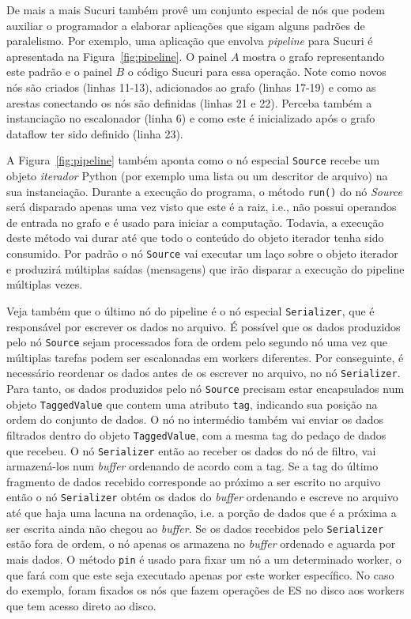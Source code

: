De mais a mais Sucuri também provê um conjunto especial de nós que podem auxiliar o programador a elaborar aplicações que sigam alguns padrões de paralelismo.
Por exemplo, uma aplicação que envolva \emph{pipeline} para Sucuri é apresentada na Figura~\ref{fig:pipeline}.
O painel $A$ mostra o grafo representando este padrão e o painel $B$ o código Sucuri para essa operação.
Note como novos nós são criados (linhas 11-13), adicionados ao grafo (linhas 17-19) e como as arestas conectando os nós são definidas (linhas 21 e 22).
Perceba também a instanciação no escalonador (linha 6) e como este é inicializado após o grafo dataflow ter sido definido (linha 23).

A Figura~\ref{fig:pipeline} também aponta como o nó especial \texttt{Source} recebe um objeto \emph{iterador} Python (por exemplo uma lista ou um descritor de arquivo) na sua instanciação.
Durante a execução do programa, o método \texttt{run()} do nó \emph{Source} será disparado apenas uma vez visto que este é a raiz, i.e., não possui operandos de entrada no grafo e é usado para iniciar a computação.
Todavia, a execução deste método vai durar até que todo o conteúdo do objeto iterador tenha sido consumido.
Por padrão o nó \texttt{Source} vai executar um laço sobre o objeto iterador e produzirá múltiplas saídas (mensagens) que irão disparar a execução do pipeline múltiplas vezes.

Veja também que o último nó do pipeline é o nó especial \texttt{Serializer}, que é responsável por escrever os dados no arquivo.
É possível que os dados produzidos pelo nó \texttt{Source} sejam processados fora de ordem pelo segundo nó uma vez que múltiplas tarefas podem ser escalonadas em workers diferentes.
Por conseguinte, é necessário reordenar os dados antes de os escrever no arquivo, no nó \texttt{Serializer}.
Para tanto, os dados produzidos pelo nó \texttt{Source} precisam estar encapsulados num objeto \texttt{TaggedValue} que contem uma atributo \texttt{tag}, indicando sua posição na ordem do conjunto de dados.
O nó no intermédio também vai enviar os dados filtrados dentro do objeto \texttt{TaggedValue}, com a mesma tag do pedaço de dados que recebeu.
O nó \texttt{Serializer} então ao receber os dados do nó de filtro, vai armazená-los num \emph{buffer} ordenando de acordo com a tag.
Se a tag do último fragmento de dados recebido corresponde ao próximo a ser escrito no arquivo então o nó \texttt{Serializer} obtém os dados do \emph{buffer} ordenando e escreve no arquivo até que haja uma lacuna na ordenação, i.e. a porção de dados que é a próxima a ser escrita ainda não chegou ao \emph{buffer}.
Se os dados recebidos pelo \texttt{Serializer} estão fora de ordem, o nó apenas os armazena no \emph{buffer} ordenado e aguarda por mais dados.
O método \texttt{pin\(\)} é usado para fixar um nó a um determinado worker, o que fará com que este seja executado apenas por este worker específico.
No caso do exemplo, foram fixados os nós que fazem operações de E\/S no disco aos workers que tem acesso direto ao disco.

